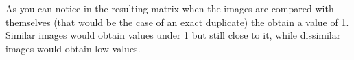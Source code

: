  
As you can notice in the resulting matrix when the images are compared with themselves (that would be the case of an exact duplicate) the obtain a value of 1. Similar images would obtain values under 1 but still close to it, while dissimilar images would obtain low values.
